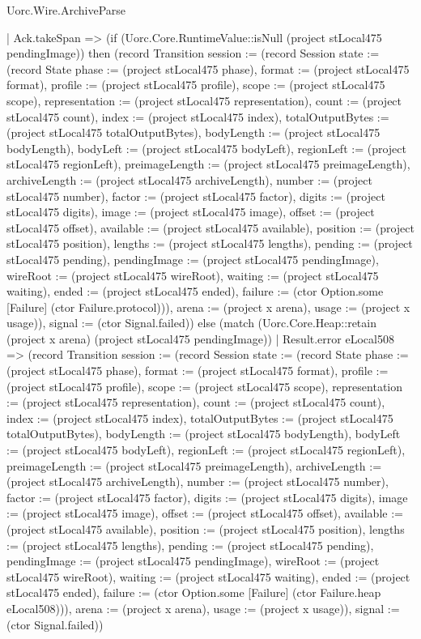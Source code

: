 \begin{lexlean}{Uorc.Wire.ArchiveParse}
\begin{semanticmodule}
{          | Ack.takeSpan => (if (Uorc.Core.RuntimeValue::isNull (project stLocal475 pendingImage)) then (record Transition {session := (record Session {state := (record State {phase := (project stLocal475 phase), format := (project stLocal475 format), profile := (project stLocal475 profile), scope := (project stLocal475 scope), representation := (project stLocal475 representation), count := (project stLocal475 count), index := (project stLocal475 index), totalOutputBytes := (project stLocal475 totalOutputBytes), bodyLength := (project stLocal475 bodyLength), bodyLeft := (project stLocal475 bodyLeft), regionLeft := (project stLocal475 regionLeft), preimageLength := (project stLocal475 preimageLength), archiveLength := (project stLocal475 archiveLength), number := (project stLocal475 number), factor := (project stLocal475 factor), digits := (project stLocal475 digits), image := (project stLocal475 image), offset := (project stLocal475 offset), available := (project stLocal475 available), position := (project stLocal475 position), lengths := (project stLocal475 lengths), pending := (project stLocal475 pending), pendingImage := (project stLocal475 pendingImage), wireRoot := (project stLocal475 wireRoot), waiting := (project stLocal475 waiting), ended := (project stLocal475 ended), failure := (ctor Option.some [Failure] (ctor Failure.protocol))}), arena := (project x arena), usage := (project x usage)}), signal := (ctor Signal.failed)}) else (match (Uorc.Core.Heap::retain (project x arena) (project stLocal475 pendingImage))
            | Result.error eLocal508 => (record Transition {session := (record Session {state := (record State {phase := (project stLocal475 phase), format := (project stLocal475 format), profile := (project stLocal475 profile), scope := (project stLocal475 scope), representation := (project stLocal475 representation), count := (project stLocal475 count), index := (project stLocal475 index), totalOutputBytes := (project stLocal475 totalOutputBytes), bodyLength := (project stLocal475 bodyLength), bodyLeft := (project stLocal475 bodyLeft), regionLeft := (project stLocal475 regionLeft), preimageLength := (project stLocal475 preimageLength), archiveLength := (project stLocal475 archiveLength), number := (project stLocal475 number), factor := (project stLocal475 factor), digits := (project stLocal475 digits), image := (project stLocal475 image), offset := (project stLocal475 offset), available := (project stLocal475 available), position := (project stLocal475 position), lengths := (project stLocal475 lengths), pending := (project stLocal475 pending), pendingImage := (project stLocal475 pendingImage), wireRoot := (project stLocal475 wireRoot), waiting := (project stLocal475 waiting), ended := (project stLocal475 ended), failure := (ctor Option.some [Failure] (ctor Failure.heap eLocal508))}), arena := (project x arena), usage := (project x usage)}), signal := (ctor Signal.failed)})
}
\end{semanticmodule}
\end{lexlean}
